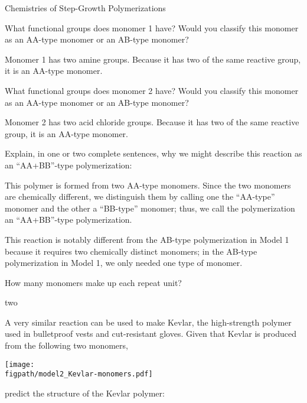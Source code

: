 \begin{activity}{Chemistries of Step-Growth Polymerizations}
\begin{ctqs}
		\question What functional groups does monomer 1 have?   Would you classify this monomer as an AA-type monomer or an AB-type monomer?
			
				\begin{solution}[0.75in]
					Monomer 1 has two amine groups.  Because it has two of the same reactive group, it is an AA-type monomer.
				\end{solution}
		
		\question What functional groups does monomer 2 have?   Would you classify this monomer as an AA-type monomer or an AB-type monomer?
			
				\begin{solution}[0.75in]
					Monomer 2 has two acid chloride groups.  Because it has two of the same reactive group, it is an AA-type monomer.
				\end{solution}
		
		\question Explain, in one or two complete sentences, why we might describe this reaction as an ``AA+BB''-type polymerization:
			
				\begin{solution}[1.75in]
					This polymer is formed from two AA-type monomers.  Since the two monomers are chemically different, we distinguish them by calling one the ``AA-type'' monomer and the other a ``BB-type'' monomer; thus, we call the polymerization an ``AA+BB''-type polymerization.
					
					This reaction is notably different from the AB-type polymerization in Model 1 because it requires two chemically distinct monomers; in the AB-type polymerization in Model 1, we only needed one type of monomer.
				\end{solution}
		
		\question How many monomers make up each repeat unit?
			
				\begin{solution}[1in]
					two
				\end{solution}
		
		\question A very similar reaction can be used to make Kevlar, the high-strength polymer used in bulletproof vests and cut-resistant gloves.  Given that Kevlar is produced from the following two monomers,
		
	
	\centerline{\texttt{[image: \\figpath/model2\_Kevlar-monomers.pdf]}}
		
		predict the structure of the Kevlar polymer:
			
				\begin{solution}[2.5in]
\end{solution}
\end{ctqs}
\end{activity}
